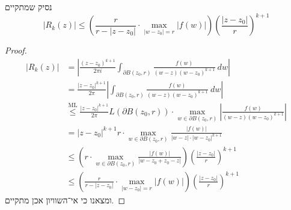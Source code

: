 \subquestion{}
נסיק שמתקיים
\[
	|R_k(z)|
	\le \left( \frac{r}{r - |z - z_0|} \cdot \max_{|w - z_0| = r} |f(w)| \right) {\left(\frac{|z - z_0|}{r}\right)}^{k + 1}
\]
\begin{proof}
	\begin{align*}
		|R_k(z)|
		& = \left\lvert \frac{{(z - z_0)}^{k + 1}}{2\pi i} \int_{\partial B(z_0, r)} \frac{f(w)}{(w - z){(w - z_0)}^{k + 1}}\ dw \right\rvert \\
		& = \frac{{|z - z_0|}^{k + 1}}{2\pi} \left\lvert \int_{\partial B(z_0, r)} \frac{f(w)}{(w - z){(w - z_0)}^{k + 1}}\ dw \right\rvert \\
		& \overset{\text{ML}}{\le} \frac{{|z - z_0|}^{k + 1}}{2\pi} L(\partial B(z_0, r)) \cdot \max_{w \in \partial B(z_0, r)} \left\lvert \frac{f(w)}{(w - z){(w - z_0)}^{k + 1}} \right\rvert \\
		& = {|z - z_0|}^{k + 1} r \cdot \max_{w \in \partial B(z_0, r)} \frac{|f(w)|}{|w - z| \cdot {|w - z_0|}^{k + 1}}  \\
		& \le \left(r \cdot \max_{w \in \partial B(z_0, r)} \frac{|f(w)|}{|w - z_0 + z_0 - z|}\right) {\left(\frac{|z - z_0|}{r}\right)}^{k + 1} \\
		& \le \left( \frac{r}{r - |z - z_0|} \cdot \max_{|w - z_0| = r} |f(w)| \right) {\left(\frac{|z - z_0|}{r}\right)}^{k + 1}
	\end{align*}
	ומצאנו כי אי־השוויון אכן מתקיים.
\end{proof}

